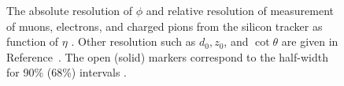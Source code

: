 \begin{figure}
  \caption{The absolute resolution of $\phi$ and relative resolution of \pt measurement
  of muons, electrons, and charged pions from the silicon tracker as function of 
  $\eta$ \cite{Chatrchyan:2014fea}. Other resolution such as $d_0, z_0$, 
  and $\cot\theta$ are given in Reference~\cite{Chatrchyan:2014fea}. The open (solid) markers 
  correspond to the half-width for 90\% (68\%) intervals \cite{Chatrchyan:2014fea}.}
  \label{fig:cms_track_reso_part}
\end{figure}
